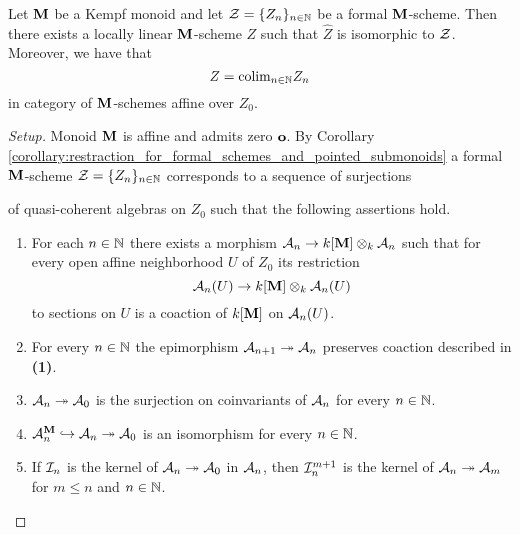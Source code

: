 \begin{theorem}\label{theorem:every_formal_over_kempf_monoid_is_formal_neighborhood}
Let $\mathbf{M}$ be a Kempf monoid and let ${\mathcal Z} = \{Z_n\}_{n\in {\mathbb N}}$ be a formal $\mathbf{M}$-scheme. Then there exists a locally linear $\mathbf{M}$-scheme $Z$ such that $\widehat{Z}$ is isomorphic to ${\mathcal Z}$. Moreover, we have that
$$Z = \mathrm{colim}_{n\in {\mathbb N}}Z_n$$
in category of $\mathbf{M}$-schemes affine over $Z_0$.
\end{theorem}
\begin{proof}[Setup]
Monoid $\mathbf{M}$ is affine and admits zero $\mathbf{o}$. By Corollary \ref{corollary:restraction_for_formal_schemes_and_pointed_submonoids} a formal $\mathbf{M}$-scheme ${\mathcal Z} = \{Z_n\}_{n\in {\mathbb N}}$ corresponds to a sequence of surjections
\begin{center}
\end{center}
of quasi-coherent algebras on $Z_0$ such that the following assertions hold.
\begin{enumerate}[label=\textbf{(\arabic*)}, leftmargin=3.0em]
\item For each $n\in {\mathbb N}$ there exists a morphism ${\mathcal A}_n\rightarrow k[\mathbf{M}]\otimes_k{\mathcal A}_n$ such that for every open affine neighborhood $U$ of $Z_0$ its restriction 
$${\mathcal A}_n(U)\rightarrow k[\mathbf{M}]\otimes_k {\mathcal A}_n(U)$$
to sections on $U$ is a coaction of $k[\mathbf{M}]$ on ${\mathcal A}_n(U)$.
\item For every $n\in {\mathbb N}$ the epimorphism ${\mathcal A}_{n+1} \twoheadrightarrow {\mathcal A}_n$ preserves coaction described in \textbf{(1)}.
\item ${\mathcal A}_n\twoheadrightarrow {\mathcal A}_0$ is the surjection on coinvariants of ${\mathcal A}_n$ for every $n\in {\mathbb N}$.
\item ${\mathcal A}_n^{\mathbf{M}}\hookrightarrow {\mathcal A}_n\twoheadrightarrow {\mathcal A}_0$ is an isomorphism for every $n\in {\mathbb N}$.
\item If ${\mathcal I}_n$ is the kernel of ${\mathcal A}_n\twoheadrightarrow {\mathcal A}_0$ in ${\mathcal A}_n$, then ${\mathcal I}_n^{m+1}$ is the kernel of ${\mathcal A}_n\twoheadrightarrow {\mathcal A}_m$ for $m\leq n$ and $n\in {\mathbb N}$.

\end{enumerate}
\end{proof}

